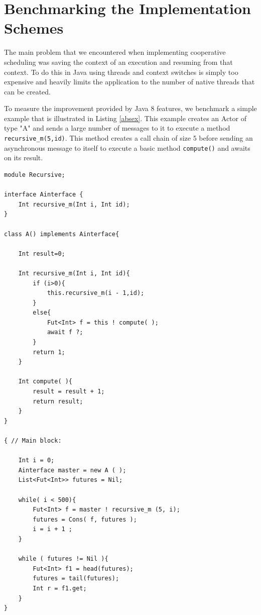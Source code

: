 \section{Benchmarking the Implementation Schemes}
\label{bench}
The main problem that we encountered  when implementing cooperative scheduling was saving the context of an execution and resuming from that context. To do this in Java using threads and context switches is simply too expensive and heavily limits the application to the number of native threads that can be created. 

To measure the improvement provided by Java 8 features, we benchmark a
simple example that is illustrated in Listing \ref{absex}. 
This example creates an Actor of type "A" and sends a large number of messages to it to execute a method \lstinline|recursive_m(5,id)|. This method creates a call chain of size 5 before sending an asynchronous message to itself to execute a basic method \lstinline|compute()| and awaits on its result.




\begin{lstlisting}[caption= ABS Benchmark Example, label=absex]
module Recursive;

interface Ainterface {
	Int recursive_m(Int i, Int id);
}

class A() implements Ainterface{

	Int result=0;
	
	Int recursive_m(Int i, Int id){
		if (i>0){
			this.recursive_m(i - 1,id);	
		}
		else{
			Fut<Int> f = this ! compute( );
			await f ?;
		}
		return 1;
	}
	
	Int compute( ){
		result = result + 1;
		return result;
	}
}

{ // Main block:

	Int i = 0;	
	Ainterface master = new A ( );
	List<Fut<Int>> futures = Nil;
	
	while( i < 500){		
		Fut<Int> f = master ! recursive_m (5, i);
		futures = Cons( f, futures );
		i = i + 1 ;
	}
	
	while ( futures != Nil ){
		Fut<Int> f1 = head(futures);
		futures = tail(futures);
		Int r = f1.get;
	}
}
\end{lstlisting}

